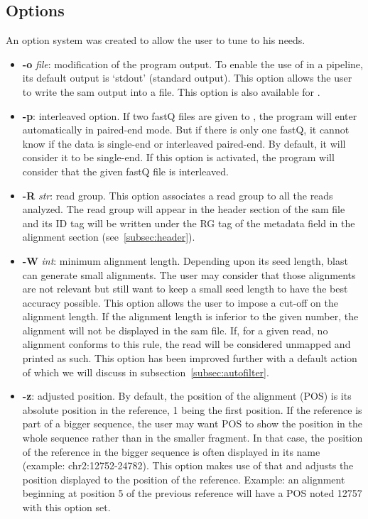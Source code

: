\subsection{Options}
\label{subsec:options}
An option system was created to allow the user to tune \blastobam{} to his needs.
\begin{itemize}
    \item \textbf{-o} \emph{file}: modification of the program output.
    To enable the use of \blastobam{} in a pipeline, its default output is `stdout' (standard output).
    This option allows the user to write the \gls{sam} output into a file.
    This option is also available for \fastqtofasta{}.
    \item \textbf{-p}: interleaved option.
    If two fastQ files are given to \blastobam{}, the program will enter automatically in paired-end mode.
    But if there is only one fastQ, it cannot know if the data is single-end or interleaved paired-end. By default, it will consider it to be single-end.
    If this option is activated, the program will consider that the given fastQ file is interleaved.
    \item \textbf{-R} \emph{str}: read group. This option associates a read group to all the reads analyzed.
    The read group will appear in the header section of the \gls{sam} file and its ID tag will be written under the RG tag of the metadata field in the alignment section (see~\ref{subsec:header}).
    \item \textbf{-W} \emph{int}: minimum alignment length.
    Depending upon its seed length, \gls{blast} can generate small alignments.
    The user may consider that those alignments are not relevant but still want to keep a small seed length to have the best accuracy possible.
    This option allows the user to impose a cut-off on the alignment length.
    If the alignment length is inferior to the given number, the alignment will not be displayed in the \gls{sam} file.
    If, for a given read, no alignment conforms to this rule, the read will be considered unmapped and printed as such.
    This option has been improved further with a default action of which we will discuss in subsection~\ref{subsec:autofilter}.
    \item \textbf{-z}: adjusted position.
    By default, the position of the alignment (POS) is its absolute position in the reference, 1 being the first position.
    If the reference is part of a bigger sequence, the user may want POS to show the position in the whole sequence rather than in the smaller fragment.
    In that case, the position of the reference in the bigger sequence is often displayed in its name (example: chr2:12752-24782).
    This option makes use of that and adjusts the position displayed to the position of the reference.
    Example: an alignment beginning at position 5 of the previous reference will have a POS noted 12757 with this option set.
\end{itemize}


